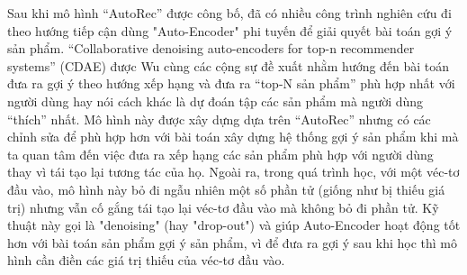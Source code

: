 
Sau khi mô hình ``AutoRec'' được công bố, đã có nhiều công trình nghiên cứu đi theo hướng tiếp cận dùng "Auto-Encoder" phi tuyến để giải quyết bài toán gợi ý sản phẩm. 
``Collaborative denoising auto-encoders for top-n recommender systems'' \cite{cdae} (CDAE) được Wu cùng các cộng sự đề xuất nhằm hướng đến bài toán đưa ra gợi ý theo hướng xếp hạng và đưa ra ``top-N sản phẩm'' phù hợp nhất với người dùng hay nói cách khác là dự đoán tập các sản phẩm mà người dùng ``thích'' nhất. 
Mô hình này được xây dựng dựa trên ``AutoRec'' nhưng có các chỉnh sửa để phù hợp hơn với bài toán xây dựng hệ thống gợi ý sản phẩm khi mà ta quan tâm đến việc đưa ra xếp hạng các sản phẩm phù hợp với người dùng thay vì tái tạo lại tương tác của họ. 
Ngoài ra, trong quá trình học, với một véc-tơ đầu vào, mô hình này bỏ đi ngẫu nhiên một số phần tử (giống như bị thiếu giá trị) nhưng vẫn cố gắng tái tạo lại véc-tơ đầu vào mà không bỏ đi phần tử. 
Kỹ thuật này gọi là "denoising" (hay "drop-out") và giúp Auto-Encoder hoạt động tốt hơn với bài toán sản phẩm gợi ý sản phẩm, vì để đưa ra gợi ý sau khi học thì mô hình cần điền các giá trị thiếu của véc-tơ đầu vào.

